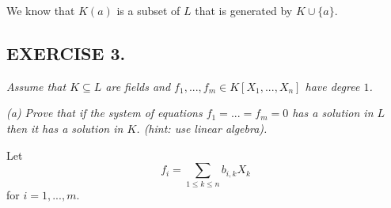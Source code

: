 \documentclass{article}
\begin{document}
We know that $K(a)$ is a subset of $L$ that is generated by $K\cup\{a\}$.

\subsection*{EXERCISE 3.}
\emph{Assume that $K\subseteq L$ are fields and $f_1,...,f_m\in K[X_1,...,X_n]$ have degree $1$.}

\emph{(a) Prove that if the system of equations $f_1=...=f_m=0$ has a solution in $L$ then it has a solution in $K$. (hint: use linear algebra).}
\smallskip

Let
$$f_i=\sum\limits_{1\leq k\leq n}b_{i, k}X_k$$
for $i=1,...,m$.





\end{document}
